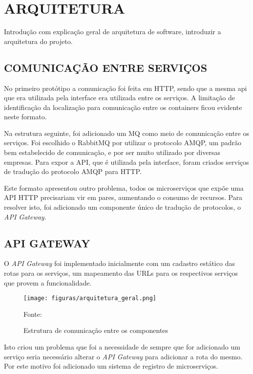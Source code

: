 \chapter{ARQUITETURA}
\label{chp:arquitetura}

Introdução com explicação geral de arquitetura de software, introduzir a
arquitetura do projeto.

\section{COMUNICAÇÃO ENTRE SERVIÇOS}

No primeiro protótipo a comunicação foi feita em \ac{HTTP}, sendo que a mesma api
que era utilizada pela interface era utilizada entre os serviços. A limitação
de identificação da localização para comunicação entre os containers ficou
evidente neste formato.

Na estrutura seguinte, foi adicionado um \ac{MQ} como meio de comunicação entre
os serviços. Foi escolhido o RabbitMQ por utilizar o protocolo \ac{AMQP}, um
padrão bem estabelecido de comunicação, e por ser muito utilizado por diversas
empresas. Para expor a \ac{API}, que é utilizada pela interface, foram criados
serviços de tradução do protocolo \ac{AMQP} para \ac{HTTP}.

Este formato apresentou outro problema, todos os microserviços que expõe
uma \ac{API} \ac{HTTP} precisariam vir em pares, aumentando o consumo de recursos.
Para resolver isto, foi adicionado um componente único de tradução de protocolos,
o \emph{API Gateway}.

\section{API GATEWAY}

O \emph{API Gateway} foi implementado inicialmente com um cadastro estático
das rotas para os serviços, um mapeamento das \acp{URL} para os respectivos
serviços que provem a funcionalidade.

\begin{figure}[H]
	\centering
	\caption{Estrutura de comunicação entre os componentes}
	\texttt{[image: figuras/arquitetura\_geral.png]}

    \label{fig:arch-geral}
	\footnotesize Fonte: \fonteOAutor
\end{figure}

Isto criou um problema que foi a necessidade de sempre que for adicionado um
serviço seria necessário alterar o \emph{API Gateway} para adicionar a rota
do mesmo. Por este motivo foi adicionado um sistema de registro de microserviços.

